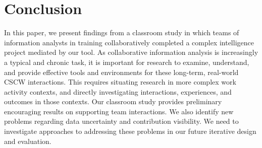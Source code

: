 \section{Conclusion}

In this paper, we present findings from a classroom study in which teams of information analysts in training collaboratively completed a complex intelligence project mediated by our tool. As collaborative information analysis is increasingly a typical and chronic task, it is important for research to examine, understand, and provide effective tools and environments for these long-term, real-world CSCW interactions. This requires situating research in more complex work activity contexts, and directly investigating interactions, experiences, and outcomes in those contexts. Our classroom study provides preliminary encouraging results on supporting team interactions. We also identify new problems regarding data uncertainty and contribution visibility. We need to investigate approaches to addressing these problems in our future iterative design and evaluation. 


%
%
%
%
%
